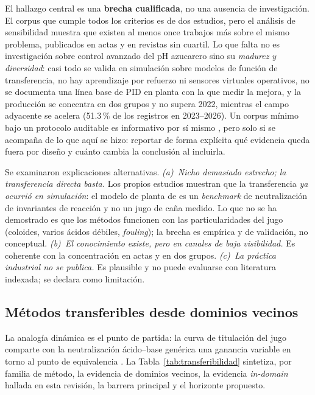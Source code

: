 El hallazgo central es una \textbf{brecha cualificada}, no una ausencia de
investigación. El corpus que cumple todos los criterios es de dos
estudios, pero el análisis de sensibilidad muestra que existen al menos
once trabajos más sobre el mismo problema, publicados en actas y en
revistas sin cuartil. Lo que falta no es investigación sobre control
avanzado del pH azucarero sino su \emph{madurez y diversidad}: casi todo
se valida en simulación sobre modelos de función de transferencia, no hay
aprendizaje por refuerzo ni sensores virtuales operativos, no se
documenta una línea base de PID en planta con la que medir la mejora, y
la producción se concentra en dos grupos y no supera 2022, mientras el
campo adyacente se acelera (51.3\,\% de los registros en 2023--2026).
Un corpus mínimo bajo un protocolo auditable es informativo por sí mismo
\parencite{yaffe2012empty,lang2007empty}, pero solo si se acompaña de lo
que aquí se hizo: reportar de forma explícita qué evidencia queda fuera
por diseño y cuánto cambia la conclusión al incluirla.

Se examinaron explicaciones alternativas. \emph{(a)~Nicho demasiado
estrecho; la transferencia directa basta.} Los propios estudios
muestran que la transferencia \emph{ya ocurrió en simulación}: el modelo
de planta de \cite{palaciomorales2021optimiza} es un \textit{benchmark}
de neutralización de invariantes de reacción
\parencite{gustafsson1983dynamic} y no un jugo de caña medido. Lo que
no se ha demostrado es que los métodos funcionen con las particularidades
del jugo (coloides, varios ácidos débiles, \textit{fouling}); la brecha es
empírica y de validación, no conceptual. \emph{(b)~El conocimiento
existe, pero en canales de baja visibilidad.} Es coherente con la
concentración en actas y en dos grupos. \emph{(c)~La práctica industrial
no se publica.} Es plausible y no puede evaluarse con literatura
indexada; se declara como limitación.

\subsection{Métodos transferibles desde dominios vecinos}
\label{sub:transferibilidad}

La analogía dinámica es el punto de partida: la curva de titulación del
jugo comparte con la neutralización ácido--base genérica una ganancia
variable en torno al punto de equivalencia \parencite{shinskey1996process}.
La Tabla~\ref{tab:transferibilidad} sintetiza, por familia de método, la
evidencia de dominios vecinos, la evidencia \textit{in-domain} hallada en
esta revisión, la barrera principal y el horizonte propuesto.

